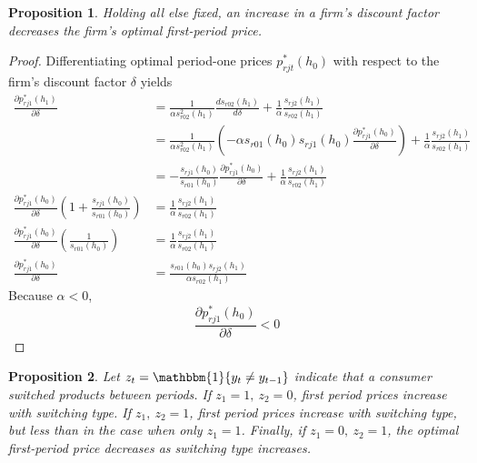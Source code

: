 \documentclass[12pt]{article}
\newtheorem{proposition}{Proposition}
\theoremstyle{definition}
\theoremstyle{remark}
\begin{document}
\begin{proposition}
\label{prop:one}
Holding all else fixed, an increase in a firm's discount factor decreases the
  firm's optimal first-period price.
\end{proposition}

\begin{proof}
  Differentiating optimal period-one prices $p_{rjt}^*(h_0)$ with respect to the
  firm's discount factor $\delta$ yields
  \begin{align*}
    \frac{\partial p_{rj1}^*(h_1)}{\partial\delta} &= \frac{1}{\alpha s^2_{r02}(h_1)}\frac{d s_{r02}(h_1)}{d\delta} + \frac{1}{\alpha}\frac{s_{rj2}(h_1)}{s_{r02}(h_1)} \\
    &= \frac{1}{\alpha s_{r02}^2(h_1)}(-\alpha
    s_{r01}(h_0)s_{rj1}(h_0)\frac{\partial p^*_{rj1}(h_0)}{\partial\delta}) +
    \frac{1}{\alpha}\frac{s_{rj2}(h_1)}{s_{r02}(h_1)} \\
    &= -\frac{s_{rj1}(h_0)}{s_{r01}(h_0)}\frac{\partial p^*_{rj1}(h_0)}{\partial\delta} +
    \frac{1}{\alpha}\frac{s_{rj2}(h_1)}{s_{r02}(h_1)} \\
    \frac{\partial
    p^*_{rj1}(h_0)}{\partial\delta}(1+\frac{s_{rj1}(h_0)}{s_{r01}(h_0)}) &=
    \frac{1}{\alpha}\frac{s_{rj2}(h_1)}{s_{r02}(h_1)} \\
    \frac{\partial
    p^*_{rj1}(h_0)}{\partial\delta}(\frac{1}{s_{r01}(h_0)}) &=
    \frac{1}{\alpha}\frac{s_{rj2}(h_1)}{s_{r02}(h_1)} \\
    \frac{\partial
    p^*_{rj1}(h_0)}{\partial\delta} &= \frac{s_{r01}(h_0)s_{rj2}(h_1)}{\alpha
    s_{r02}(h_1)}
  \end{align*}
  Because $\alpha<0$,
  \begin{equation}
    \frac{\partial p_{rj1}^*(h_0)}{\partial\delta} < 0
  \end{equation}
\end{proof}

\begin{proposition}
\label{prop:two}
  Let $z_t = \mathbbm{1}\{y_t\ne y_{t-1}\}$ indicate that a consumer switched
  products between periods. If $z_1 = 1, \ z_2=0$, first period prices increase
  with switching type. If $z_1, \ z_2 = 1$, first period prices increase with
  switching type, but less than in the case when only $z_1=1$. Finally, if $z_1=0, \ z_2=1$, the optimal first-period price decreases as switching type increases.
\end{proposition}
\end{document}
